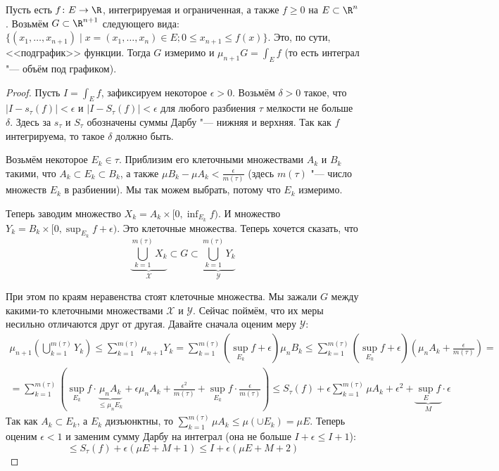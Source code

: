 \begin{theorem}
	Пусть есть $f \colon E \to \R$, интегрируемая и ограниченная, а также $f \ge 0$ на $E \subset \R^n$.
	Возьмём $G \subset \R^{n+1}$ следующего вида: $\{ (x_1, \dots, x_{n+1}) \mid x=(x_1,\dots,x_n) \in E; 0 \le x_{n+1} \le f(x) \}$.
	Это, по сути, <<подграфик>> функции.
	Тогда $G$ измеримо и $\mu_{n+1} G = \int_E f$ (то есть интеграл "--- объём под графиком).
\end{theorem}
\begin{proof}
	Пусть $I = \int_E f$, зафиксируем некоторое $\epsilon > 0$.
	Возьмём $\delta > 0$ такое, что $|I-s_\tau(f)| < \epsilon$ и $|I - S_\tau(f)| < \epsilon$
	для любого разбиения $\tau$ мелкости не больше $\delta$.
	Здесь за $s_\tau$ и $S_\tau$ обозначены суммы Дарбу "--- нижняя и верхняя.
	Так как $f$ интегрируема, то такое $\delta$ должно быть.

	Возьмём некоторое $E_k \in \tau$.
	Приблизим его клеточными множествами $A_k$ и $B_k$ такими, что $A_k \subset E_k \subset B_k$,
	а также $\mu B_k - \mu A_k < \frac{\epsilon}{m(\tau)}$ (здесь $m(\tau)$ "--- число множеств $E_k$ в разбиении).
	Мы так можем выбрать, потому что $E_k$ измеримо.

	Теперь заводим множество $X_k = A_k \times [0, \inf_{E_k} f)$.
	И множество $Y_k = B_k \times [0, \sup_{E_k} f + \epsilon)$.
	Это клеточные множества.
	Теперь хочется сказать, что
	\[
	\underbrace{\bigcup_{k=1}^{m(\tau)} X_k}_{\mathcal{X}} \subset G \subset \underbrace{\bigcup_{k=1}^{m(\tau)} Y_k}_{\mathcal{Y}}
	\]
	\begin{center}
	
	\end{center}
	При этом по краям неравенства стоят клеточные множества.
	Мы зажали $G$ между какими-то клеточными множествами $\mathcal{X}$ и $\mathcal{Y}$.
	Сейчас поймём, что их меры несильно отличаются друг от другая.
	Давайте сначала оценим меру $\mathcal{Y}$:
	\newcommand{\mysum}{\sum_{k=1}^{m(\tau)}}
	\begin{gather*}
	\mu_{n+1} \left( \bigcup_{k=1}^{m(\tau)} Y_k\right)
	\le \mysum \mu_{n+1} Y_k
	= \mysum (\sup_{E_k} f + \epsilon) \mu_{n} B_k
	\le \mysum (\sup_{E_k} f + \epsilon) (\mu_{n} A_k + \frac{\epsilon}{m(\tau)}) = \\
	= \mysum (\sup_{E_k} f \cdot \underbrace{\mu_n A_k}_{\le \mu_n E_k} + \epsilon \mu_n A_k + \frac{\epsilon^2}{m(\tau)} + \sup_{E_k} f \cdot \frac{\epsilon}{m(\tau)})
	\le S_\tau(f) + \epsilon\mysum \mu A_k + \epsilon^2 + \underbrace{\sup_E f}_{M}\cdot \epsilon
	\end{gather*}
	Так как $A_k \subset E_k$, а $E_k$ дизъюнктны, то $\mysum \mu A_k \le \mu (\cup E_k) = \mu E$.
	Теперь оценим $\epsilon < 1$ и заменим сумму Дарбу на интеграл (она не больше $I+\epsilon \le I+1$):
	\[
	\le S_\tau(f) + \epsilon(\mu E + M + 1)
	\le I + \epsilon(\mu E + M + 2)
	\]


\end{proof}
